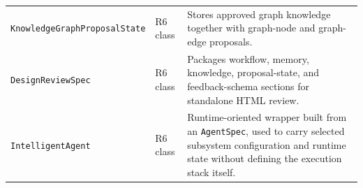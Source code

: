 \begin{table}[htbp]
\begin{tabular}{p{3.2cm} p{2.4cm} p{8.2cm}}
\texttt{KnowledgeGraphProposalState} & R6 class & Stores approved graph knowledge together with graph-node and graph-edge proposals. \\
\texttt{DesignReviewSpec} & R6 class & Packages workflow, memory, knowledge, proposal-state, and feedback-schema sections for standalone HTML review. \\
\texttt{IntelligentAgent} & R6 class & Runtime-oriented wrapper built from an \texttt{AgentSpec}, used to carry selected subsystem configuration and runtime state without defining the execution stack itself. \\
\hline
\end{tabular}
\end{table}
